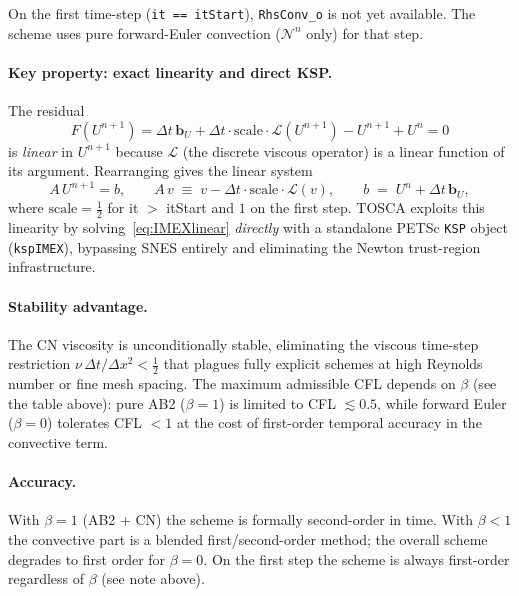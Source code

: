 \documentclass[12pt,a4paper]{article}
\newcommand{\cN}{\mathcal{N}}
\newcommand{\cL}{\mathcal{L}}
\newcommand{\dt}{\Delta t}
\newcommand{\half}{\tfrac{1}{2}}
\begin{document}
	\begin{notebox}
		On the first time-step (\texttt{it == itStart}), \texttt{RhsConv\_o} is
		not yet available. The scheme uses pure forward-Euler convection
		($\cN^n$ only) for that step.
	\end{notebox}
	
	\paragraph{Key property: exact linearity and direct KSP.}
	The residual
	\begin{equation}
		F(U^{n+1}) = \dt\,\bm{b}_U
		+ \dt\cdot\text{scale}\cdot\cL(U^{n+1})
		- U^{n+1} + U^n = 0
		\label{eq:IMEXres}
	\end{equation}
	is \emph{linear} in $U^{n+1}$ because $\cL$ (the discrete viscous operator)
	is a linear function of its argument.
	Rearranging gives the linear system
	\begin{equation}
		A\,U^{n+1} = b,
		\qquad
		A\,v \;\equiv\; v - \dt\cdot\text{scale}\cdot\cL(v),
		\qquad
		b \;=\; U^n + \dt\,\bm{b}_U,
		\label{eq:IMEXlinear}
	\end{equation}
	where $\text{scale} = \half$ for it $>$ itStart and $1$ on the first step.
	TOSCA exploits this linearity by solving~\eqref{eq:IMEXlinear}
	\emph{directly} with a standalone PETSc \texttt{KSP} object
	(\texttt{kspIMEX}), bypassing SNES entirely and eliminating the Newton
	trust-region infrastructure.

	\paragraph{Stability advantage.}
	The CN viscosity is unconditionally stable, eliminating the viscous
	time-step restriction $\nu\,\dt/\Delta x^2 < \tfrac{1}{2}$ that plagues
	fully explicit schemes at high Reynolds number or fine mesh spacing.
	The maximum admissible CFL depends on $\beta$ (see the table above):
	pure AB2 ($\beta=1$) is limited to CFL $\lesssim 0.5$, while forward
	Euler ($\beta=0$) tolerates CFL $<1$ at the cost of first-order temporal
	accuracy in the convective term.
	
	\paragraph{Accuracy.}
	With $\beta=1$ (AB2 + CN) the scheme is formally second-order in time.
	With $\beta<1$ the convective part is a blended first/second-order method;
	the overall scheme degrades to first order for $\beta=0$.
	On the first step the scheme is always first-order regardless of $\beta$
	(see note above).
	
\end{document}
